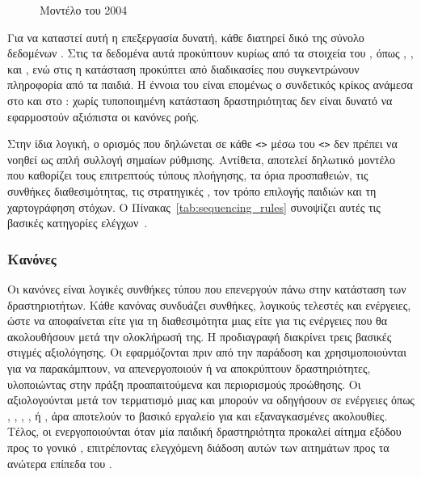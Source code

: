 \begin{figure}[htbp]
\centering

\caption{Μοντέλο  του  2004}
\label{fig:sequencing_model}
\end{figure}

Για να καταστεί αυτή η επεξεργασία δυνατή, κάθε  διατηρεί δικό της σύνολο δεδομένων . Στις  τα δεδομένα αυτά προκύπτουν κυρίως από τα στοιχεία του , όπως , ,  και , ενώ στις  η κατάσταση προκύπτει από διαδικασίες  που συγκεντρώνουν πληροφορία από τα παιδιά. Η έννοια του  είναι επομένως ο συνδετικός κρίκος ανάμεσα στο  και στο : χωρίς τυποποιημένη κατάσταση δραστηριότητας δεν είναι δυνατό να εφαρμοστούν αξιόπιστα οι κανόνες ροής.

Στην ίδια λογική, ο ορισμός  που δηλώνεται σε κάθε \texttt{<>} μέσω του \texttt{<>} δεν πρέπει να νοηθεί ως απλή συλλογή σημαίων ρύθμισης. Αντίθετα, αποτελεί δηλωτικό μοντέλο που καθορίζει τους επιτρεπτούς τύπους πλοήγησης, τα όρια προσπαθειών, τις συνθήκες διαθεσιμότητας, τις στρατηγικές , τον τρόπο επιλογής παιδιών και τη χαρτογράφηση στόχων. Ο Πίνακας~\ref{tab:sequencing_rules} συνοψίζει αυτές τις βασικές κατηγορίες ελέγχων~\cite{IMS_SimpleSequencing, ADL_SCORM2004_SN}.

\begin{table}[htbp]
\centering
\caption{Κανόνες και Έλεγχοι  2004 }
\label{tab:sequencing_rules}

\end{table}

\subsubsection{Κανόνες }

Οι κανόνες  είναι λογικές συνθήκες τύπου  που επενεργούν πάνω στην κατάσταση των δραστηριοτήτων. Κάθε κανόνας συνδυάζει συνθήκες, λογικούς τελεστές και ενέργειες, ώστε να αποφαίνεται είτε για τη διαθεσιμότητα μιας  είτε για τις ενέργειες που θα ακολουθήσουν μετά την ολοκλήρωσή της. Η προδιαγραφή διακρίνει τρεις βασικές στιγμές αξιολόγησης. Οι  εφαρμόζονται πριν από την παράδοση και χρησιμοποιούνται για να παρακάμπτουν, να απενεργοποιούν ή να αποκρύπτουν δραστηριότητες, υλοποιώντας στην πράξη προαπαιτούμενα και περιορισμούς προώθησης. Οι  αξιολογούνται μετά τον τερματισμό μιας  και μπορούν να οδηγήσουν σε ενέργειες όπως , , , ,  ή , άρα αποτελούν το βασικό εργαλείο για  και εξαναγκασμένες ακολουθίες. Τέλος, οι  ενεργοποιούνται όταν μία παιδική δραστηριότητα προκαλεί αίτημα εξόδου προς το γονικό , επιτρέποντας ελεγχόμενη διάδοση αυτών των αιτημάτων προς τα ανώτερα επίπεδα του .

